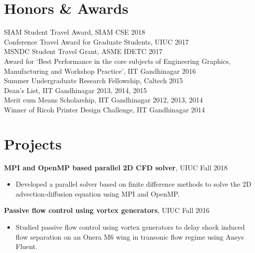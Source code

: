 \documentclass[margin]{res}
\begin{document}
\begin{resume}
\section{\large Honors \& Awards}
SIAM Student Travel Award, SIAM CSE \hfill 2018\vspace{0.1cm}\\
Conference Travel Award for Graduate Students, UIUC \hfill 2017\vspace{0.1cm}\\
MSNDC Student Travel Grant, ASME IDETC \hfill 2017\vspace{0.1cm}\\
Award for `Best Performance in the core subjects of Engineering Graphics, Manufacturing and Workshop Practice', IIT Gandhinagar \hfill 2016\vspace{0.1cm}\\
Summer Undergraduate Research Fellowship, Caltech \hfill 2015\vspace{0.1cm}\\
Dean's List, IIT Gandhinagar \hfill 2013, 2014, 2015\vspace{0.1cm}\\
Merit cum Means Scholarship, IIT Gandhinagar \hfill 2012, 2013, 2014\vspace{0.1cm}\\
Winner of Ricoh Printer Design Challenge, IIT Gandhinagar \hfill 2014


\section{\large Projects}

{\bf MPI and OpenMP based parallel 2D CFD solver}, UIUC \hfill Fall 2018
\begin{itemize}
\item Developed a parallel solver based on finite difference methods to solve the 2D advection-diffusion equation using MPI and OpenMP.
\end{itemize}

{\bf Passive flow control using vortex generators}, UIUC \hfill Fall 2016
\begin{itemize}
\item Studied passive flow control using vortex generators to delay shock induced flow separation on an Onera M6 wing in transonic flow regime using Ansys Fluent.
\end{itemize}


\end{resume}
\end{document}

